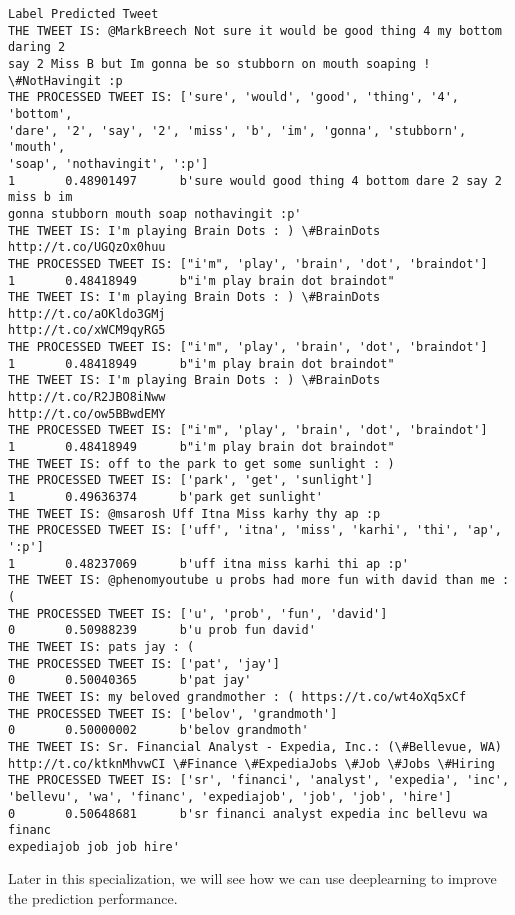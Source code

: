 \documentclass[11pt]{article}
\begin{document}
    \begin{Verbatim}[commandchars=\\\{\}]
Label Predicted Tweet
THE TWEET IS: @MarkBreech Not sure it would be good thing 4 my bottom daring 2
say 2 Miss B but Im gonna be so stubborn on mouth soaping ! \#NotHavingit :p
THE PROCESSED TWEET IS: ['sure', 'would', 'good', 'thing', '4', 'bottom',
'dare', '2', 'say', '2', 'miss', 'b', 'im', 'gonna', 'stubborn', 'mouth',
'soap', 'nothavingit', ':p']
1       0.48901497      b'sure would good thing 4 bottom dare 2 say 2 miss b im
gonna stubborn mouth soap nothavingit :p'
THE TWEET IS: I'm playing Brain Dots : ) \#BrainDots
http://t.co/UGQzOx0huu
THE PROCESSED TWEET IS: ["i'm", 'play', 'brain', 'dot', 'braindot']
1       0.48418949      b"i'm play brain dot braindot"
THE TWEET IS: I'm playing Brain Dots : ) \#BrainDots http://t.co/aOKldo3GMj
http://t.co/xWCM9qyRG5
THE PROCESSED TWEET IS: ["i'm", 'play', 'brain', 'dot', 'braindot']
1       0.48418949      b"i'm play brain dot braindot"
THE TWEET IS: I'm playing Brain Dots : ) \#BrainDots http://t.co/R2JBO8iNww
http://t.co/ow5BBwdEMY
THE PROCESSED TWEET IS: ["i'm", 'play', 'brain', 'dot', 'braindot']
1       0.48418949      b"i'm play brain dot braindot"
THE TWEET IS: off to the park to get some sunlight : )
THE PROCESSED TWEET IS: ['park', 'get', 'sunlight']
1       0.49636374      b'park get sunlight'
THE TWEET IS: @msarosh Uff Itna Miss karhy thy ap :p
THE PROCESSED TWEET IS: ['uff', 'itna', 'miss', 'karhi', 'thi', 'ap', ':p']
1       0.48237069      b'uff itna miss karhi thi ap :p'
THE TWEET IS: @phenomyoutube u probs had more fun with david than me : (
THE PROCESSED TWEET IS: ['u', 'prob', 'fun', 'david']
0       0.50988239      b'u prob fun david'
THE TWEET IS: pats jay : (
THE PROCESSED TWEET IS: ['pat', 'jay']
0       0.50040365      b'pat jay'
THE TWEET IS: my beloved grandmother : ( https://t.co/wt4oXq5xCf
THE PROCESSED TWEET IS: ['belov', 'grandmoth']
0       0.50000002      b'belov grandmoth'
THE TWEET IS: Sr. Financial Analyst - Expedia, Inc.: (\#Bellevue, WA)
http://t.co/ktknMhvwCI \#Finance \#ExpediaJobs \#Job \#Jobs \#Hiring
THE PROCESSED TWEET IS: ['sr', 'financi', 'analyst', 'expedia', 'inc',
'bellevu', 'wa', 'financ', 'expediajob', 'job', 'job', 'hire']
0       0.50648681      b'sr financi analyst expedia inc bellevu wa financ
expediajob job job hire'
    \end{Verbatim}

    Later in this specialization, we will see how we can use deeplearning to
improve the prediction performance.
\end{document}

